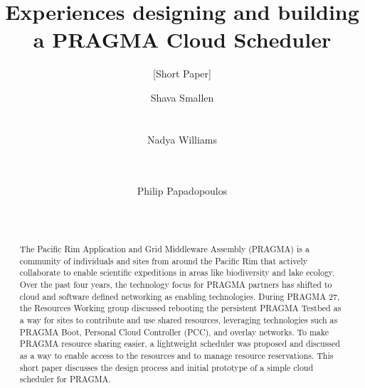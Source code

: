 \documentclass{acm_proc_article-sp}
\begin{document}
\title{Experiences designing and building a PRAGMA Cloud Scheduler}
\subtitle{[Short Paper]}


\author{
\alignauthor
Shava Smallen\\
      \\
      \\
\alignauthor
Nadya Williams\\
      \\
      \\
\and %
\alignauthor Philip Papadopoulos \\
      \\
      \\
}

\maketitle
\begin{abstract}
The Pacific Rim Application and Grid Middleware Assembly (PRAGMA) is a community of individuals and sites from around the Pacific Rim that actively collaborate to enable scientific expeditions in areas like biodiversity and lake ecology.  Over the past four years, the technology focus for PRAGMA partners has shifted to cloud and software defined networking as enabling technologies.  During PRAGMA 27, the Resources Working group discussed rebooting the persistent PRAGMA Testbed as a way for sites to contribute and use shared resources, leveraging technologies such as PRAGMA Boot, Personal Cloud Controller (PCC), and overlay networks.  To make PRAGMA resource sharing easier, a lightweight scheduler was proposed and discussed as a way to enable access to the resources and to manage resource reservations.  This short paper discusses the design process and initial prototype of a simple cloud scheduler for PRAGMA.  

\end{abstract}

\end{document}
